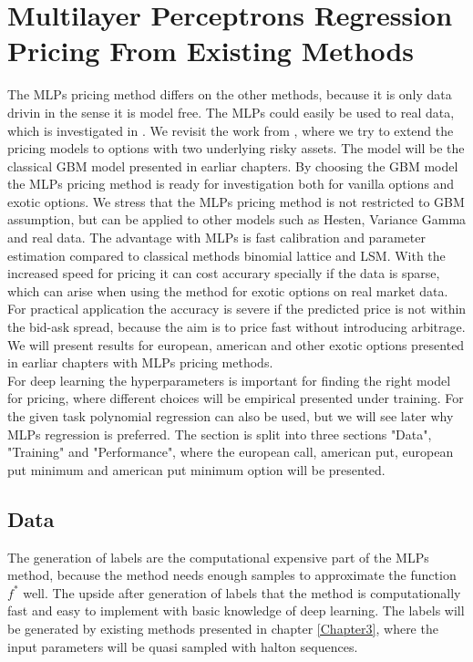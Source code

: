 \section{Multilayer Perceptrons Regression Pricing From Existing Methods}
The MLPs pricing method differs on the other methods, because it is only data drivin in the sense it is model free. The MLPs could easily be used to real data, which is investigated in \parencite{GasparRaquel20}. We revisit the work from \parencite{HirsaAli2019}, where we try to extend the pricing models to options with two underlying risky assets. The model will be the classical GBM model presented in earliar chapters. By choosing the GBM model the MLPs pricing method is ready for investigation both for vanilla options and exotic options. We stress that the MLPs pricing method is not restricted to GBM assumption, but can be applied to other models such as Hesten, Variance Gamma and real data. The advantage with MLPs is fast calibration and parameter estimation compared to classical methods binomial lattice and LSM. With the increased speed for pricing it can cost accurary specially if the data is sparse, which can arise when using the method for exotic options on real market data. For practical application the accuracy is severe if the predicted price is not within the bid-ask spread, because the aim is to price fast without introducing arbitrage. We will present results for european, american and other exotic options presented in earliar chapters with MLPs pricing methods.\\

For deep learning the hyperparameters is important for finding the right model for pricing, where different choices will be empirical presented under training. For the given task polynomial regression can also be used, but we will see later why MLPs regression is preferred. The section is split into three sections "Data", "Training" and "Performance", where the european call, american put, european put minimum and american put minimum option will be presented.

\subsection{Data}
The generation of labels are the computational expensive part of the MLPs method, because the method needs enough samples to approximate the function $f^*$ well. The upside after generation of labels that the method is computationally fast and easy to implement with basic knowledge of deep learning. The labels will be generated by existing methods presented in chapter \ref{Chapter3}, where the input parameters will be quasi sampled with halton sequences.\\

